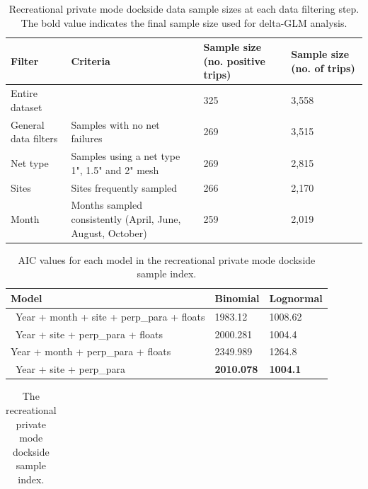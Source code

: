 \documentclass[12pt,]{article}
\begin{document}
\FloatBarrier

\begin{table}[ht]
\centering
\caption{Recreational private mode dockside data sample 
                                          sizes at each data filtering step.  
                                          The bold value indicates the final sample size 
                                          used for delta-GLM analysis.} 
\label{tab:Fleet9_GillnetSurvey_filter}
\begin{tabular}{>{\raggedright}p{1.5in}>{\raggedright}p{2.6in}>{\raggedright}p{1in}>{\raggedright}p{1in}}
  \hline
Filter & Criteria & Sample size (no. positive trips) & Sample size (no. of trips) \\ 
  \hline
Entire dataset &  & 325 & 3,558 \\ 
  General data filters & Samples with  no net failures & 269 & 3,515 \\ 
  Net type & Samples using a net type 1", 1.5" and 2" mesh & 269 & 2,815 \\ 
  Sites & Sites frequently sampled & 266 & 2,170 \\ 
  Month & Months sampled consistently (April, June, August, October) & 259 & 2,019 \\ 
   \hline
\end{tabular}
\end{table}\begin{table}[ht]
\centering
\caption{AIC values for each model in the
                                          recreational private mode dockside sample 
                                          index.} 
\label{tab:Fleet9_GillnetSurvey_aic}
\begin{tabular}{lll}
  \hline
Model & Binomial & Lognormal \\ 
  \hline
~Year + month + site + perp\_para + floats & 1983.12 & 1008.62 \\ 
  ~Year + site + perp\_para  + floats & 2000.281 & 1004.4 \\ 
   Year + month  + perp\_para + floats & 2349.989 & 1264.8 \\ 
  ~Year  + site +  perp\_para & \textbf{2010.078} & \textbf{1004.1} \\ 
   \hline
\end{tabular}
\end{table}\begin{table}[ht]
\centering
\caption{The recreational private mode 
                                            dockside sample index.} 
\label{tab:Fleet9_GillnetSurvey_index}
\begin{tabular}{rrr}

\end{tabular}
\end{table}
\end{document}

